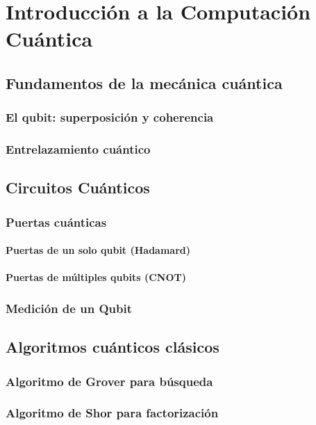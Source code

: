 \chapter{Introducción a la Computación Cuántica}

\section{Fundamentos de la mecánica cuántica}
\subsection{El qubit: superposición y coherencia}
\subsection{Entrelazamiento cuántico}

\section{Circuitos Cuánticos}
\subsection{Puertas cuánticas}
\subsubsection{Puertas de un solo qubit (Hadamard)}
\subsubsection{Puertas de múltiples qubits (CNOT)}
\subsection{Medición de un Qubit}

\section{Algoritmos cuánticos clásicos}
\subsection{Algoritmo de Grover para búsqueda}
\subsection{Algoritmo de Shor para factorización}